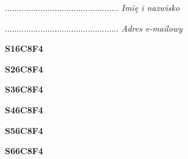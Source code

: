 \begin{turn}{90}\begin{minipage}{\linewidth} \vspace{20mm} ................................................  \textit{Imię i nazwisko}\end{minipage}\end{turn}

\begin{turn}{90}\begin{minipage}{\linewidth} \vspace{20mm} ................................................  \textit{Adres e-mailowy}\end{minipage}\end{turn}

\begin{turn}{90}\huge \begin{minipage}{\linewidth} \vspace{10mm}\textbf{S16C8F4}\end{minipage}\end{turn}

\begin{turn}{90}\huge \begin{minipage}{\linewidth} \vspace{10mm}\textbf{S26C8F4}\end{minipage}\end{turn}

\begin{turn}{90}\huge \begin{minipage}{\linewidth} \vspace{10mm}\textbf{S36C8F4}\end{minipage}\end{turn}

\begin{turn}{90}\huge \begin{minipage}{\linewidth} \vspace{10mm}\textbf{S46C8F4}\end{minipage}\end{turn}

\begin{turn}{90}\huge \begin{minipage}{\linewidth} \vspace{10mm}\textbf{S56C8F4}\end{minipage}\end{turn}

\begin{turn}{90}\huge \begin{minipage}{\linewidth} \vspace{10mm}\textbf{S66C8F4}\end{minipage}\end{turn}

